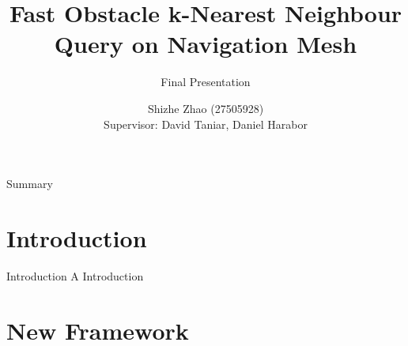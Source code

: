 \documentclass{beamer}
\title[Fast Obstacle k-Nearest Neighbour Query on Navigation Mesh]{
    Fast Obstacle k-Nearest Neighbour Query on Navigation Mesh \\
}
\subtitle {Final Presentation}
\date{}
\author[Shizhe Zhao]{
    Shizhe Zhao (27505928)\\
    Supervisor: David Taniar, Daniel Harabor
}
\begin{document}

\frame{\titlepage}
\section[]{}
\begin{frame}{Summary}
  \tableofcontents
\end{frame}

\section{Introduction}
\begin{frame}{Introduction}
A Introduction
\end{frame}

\section{New Framework}




\end{document}
